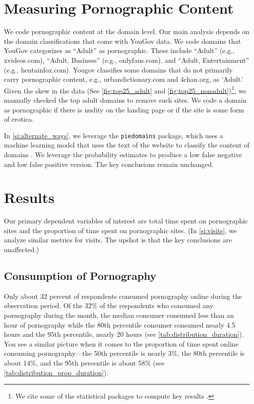 \documentclass[12pt, letterpaper]{article}
\begin{document}
\section*{Measuring Pornographic Content}\label{sec:measuring_porn_content}

We code pornographic content at the domain level. Our main analysis depends on the domain classifications that come with YouGov data. We code domains that YouGov categorizes as ``Adult'' as pornographic. These include ``Adult'' (e.g., xvideos.com), ``Adult, Business'' (e.g., onlyfans.com), and ``Adult, Entertainment'' (e.g., hentainfox.com). Yougov classifies some domains that do not primarily carry pornographic content, e.g., urbandictionary.com and 4chan.org, as `Adult.' Given the skew in the data (See \cref{fig:top25_adult} and \cref{fig:top25_nonadult})\footnote{We cite some of the statistical packages to compute key results \citep{tableone, statsmodels, forestplot, scipy}.}, we manually checked the top adult domains to remove such sites. We code a domain as pornographic if there is nudity on the landing page or if the site is some form of erotica. 

In \ref{si:alternate_ways}, we leverage the \texttt{piedomains} package, which uses a machine learning model that uses the text of the website to classify the content of domains \citep{Chintalapati_piedomains_Predict_the_2022}. We leverage the probability estimates to produce a low false negative and low false positive version. The key conclusions remain unchanged.

\section*{Results}\label{sec:results}

Our primary dependent variables of interest are total time spent on pornographic sites and the proportion of time spent on pornographic sites. (In \ref{si:visits}, we analyze similar metrics for visits. The upshot is that the key conclusions are unaffected.)

\subsection*{Consumption of Pornography}
Only about 32 percent of respondents consumed pornography online during the observation period. Of the 32\% of the respondents who consumed any pornography during the month, the median consumer consumed less than an hour of pornography while the 80th percentile consumer consumed nearly 4.5 hours and the 95th percentile, nearly 20 hours (see \cref{tab:distribution_duration}). You see a similar picture when it comes to the proportion of time spent online consuming pornography---the 50th percentile is nearly 3\%, the 80th percentile is about 14\%, and the 95th percentile is about 58\% (see \ref{tab:distribution_prop_duration}). 
\end{document}
